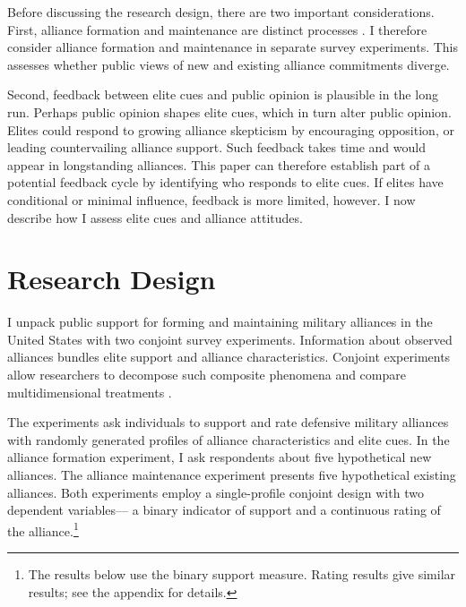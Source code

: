 \documentclass[12pt]{article}
\begin{document}
Before discussing the research design, there are two important considerations. 
First, alliance formation and maintenance are distinct processes \citep{Snyder1997}. 
I therefore consider alliance formation and maintenance in separate survey experiments.
This assesses whether public views of new and existing alliance commitments diverge. 


Second, feedback between elite cues and public opinion is plausible in the long run. 
Perhaps public opinion shapes elite cues, which in turn alter public opinion. 
Elites could respond to growing alliance skepticism by encouraging opposition, or leading countervailing alliance support.
Such feedback takes time and would appear in longstanding alliances.
This paper can therefore establish part of a potential feedback cycle by identifying who responds to elite cues.  
If elites have conditional or minimal influence, feedback is more limited, however.
I now describe how I assess elite cues and alliance attitudes. 



\section{Research Design}



I unpack public support for forming and maintaining military alliances in the United States with two conjoint survey experiments. 
Information about observed alliances bundles elite support and alliance characteristics. 
Conjoint experiments allow researchers to decompose such composite phenomena and compare multidimensional treatments \citep{Hainmuelleretal2014}. 


The experiments ask individuals to support and rate defensive military alliances with randomly generated profiles of alliance characteristics and elite cues. 
In the alliance formation experiment, I ask respondents about five hypothetical new alliances. 
The alliance maintenance experiment presents five hypothetical existing alliances.
Both experiments employ a single-profile conjoint design with two dependent variables--- a binary indicator of support and a continuous rating of the alliance.\footnote{The results below use the binary support measure. Rating results give similar results; see the appendix for details.} 
\end{document}
